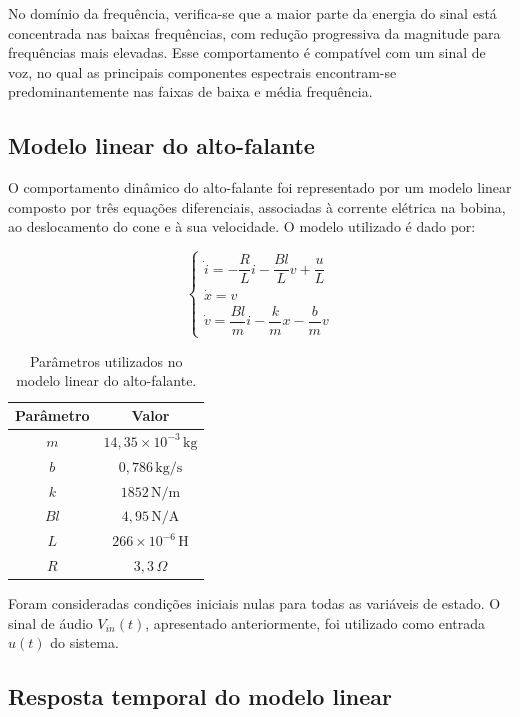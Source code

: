 No domínio da frequência, verifica-se que a maior parte da energia do sinal está concentrada nas baixas frequências, com redução progressiva da magnitude para frequências mais elevadas. Esse comportamento é compatível com um sinal de voz, no qual as principais componentes espectrais encontram-se predominantemente nas faixas de baixa e média frequência.

\subsection{Modelo linear do alto-falante}

O comportamento dinâmico do alto-falante foi representado por um modelo linear composto por três equações diferenciais, associadas à corrente elétrica na bobina, ao deslocamento do cone e à sua velocidade. O modelo utilizado é dado por:

\begin{equation}
\begin{cases}
\dot{i} = -\dfrac{R}{L}i - \dfrac{Bl}{L}v + \dfrac{u}{L} \\[6pt]
\dot{x} = v \\[6pt]
\dot{v} = \dfrac{Bl}{m}i - \dfrac{k}{m}x - \dfrac{b}{m}v
\end{cases}
\end{equation}

\begin{table}[H]
\centering
\begin{tabular}{c c}
\hline
\textbf{Parâmetro} & \textbf{Valor} \\
\hline
$m$  & $14{,}35 \times 10^{-3}\,\text{kg}$ \\
$b$  & $0{,}786\,\text{kg/s}$ \\
$k$  & $1852\,\text{N/m}$ \\
$Bl$ & $4{,}95\,\text{N/A}$ \\
$L$  & $266 \times 10^{-6}\,\text{H}$ \\
$R$  & $3{,}3\,\Omega$ \\
\hline
\end{tabular}
\caption{Parâmetros utilizados no modelo linear do alto-falante.}
\label{tab:parametros_modelo_linear}
\end{table}

Foram consideradas condições iniciais nulas para todas as variáveis de estado. O sinal de áudio \(V_{in}(t)\), apresentado anteriormente, foi utilizado como entrada \(u(t)\) do sistema.

\subsection{Resposta temporal do modelo linear}


